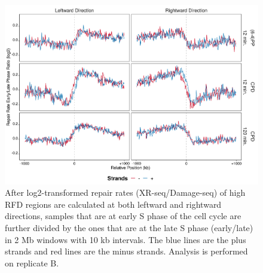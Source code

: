 \begin{figure}[H]
\begin{center}
\includegraphics[width=\textwidth]{Chapters/7_appendix/figures/supfig73}
\caption[Repair rate early/late ratio of high RFDs in 2 Mb (replicate B).]{After log2-transformed repair rates (XR-seq/Damage-seq) of high RFD regions are calculated at both leftward and rightward directions, samples that are at early S phase of the cell cycle are further divided by the ones that are at the late S phase (early/late) in 2 Mb windows with 10 kb intervals. The blue lines are the plus strands and red lines are the minus strands. Analysis is performed on replicate B.}
\label{supfig:rrel2000rfdB}
\end{center}
\end{figure}


